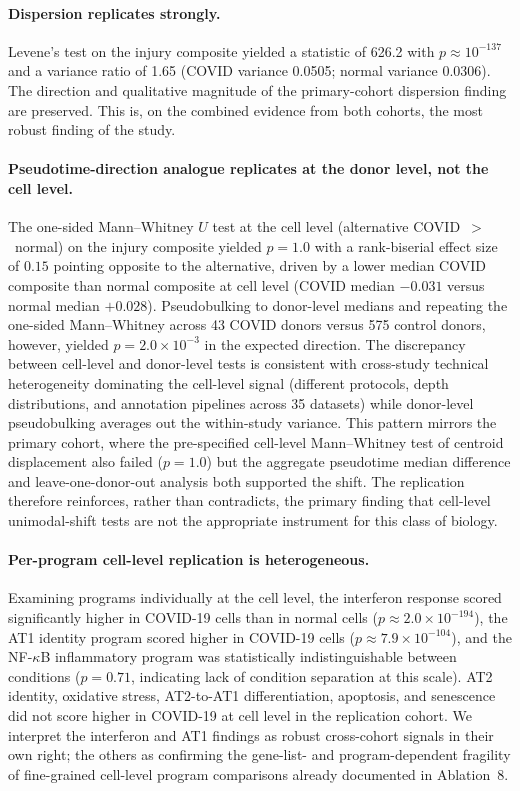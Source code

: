 \documentclass[11pt]{article}
\begin{document}
\paragraph{Dispersion replicates strongly.} Levene's test on the injury composite yielded a statistic of 626.2 with $p \approx 10^{-137}$ and a variance ratio of 1.65 (COVID variance 0.0505; normal variance 0.0306). The direction and qualitative magnitude of the primary-cohort dispersion finding are preserved. This is, on the combined evidence from both cohorts, the most robust finding of the study.

\paragraph{Pseudotime-direction analogue replicates at the donor level, not the cell level.} The one-sided Mann--Whitney $U$ test at the cell level (alternative COVID~$>$~normal) on the injury composite yielded $p = 1.0$ with a rank-biserial effect size of $0.15$ pointing opposite to the alternative, driven by a lower median COVID composite than normal composite at cell level (COVID median $-0.031$ versus normal median $+0.028$). Pseudobulking to donor-level medians and repeating the one-sided Mann--Whitney across 43 COVID donors versus 575 control donors, however, yielded $p = 2.0 \times 10^{-3}$ in the expected direction. The discrepancy between cell-level and donor-level tests is consistent with cross-study technical heterogeneity dominating the cell-level signal (different protocols, depth distributions, and annotation pipelines across 35 datasets) while donor-level pseudobulking averages out the within-study variance. This pattern mirrors the primary cohort, where the pre-specified cell-level Mann--Whitney test of centroid displacement also failed ($p = 1.0$) but the aggregate pseudotime median difference and leave-one-donor-out analysis both supported the shift. The replication therefore reinforces, rather than contradicts, the primary finding that cell-level unimodal-shift tests are not the appropriate instrument for this class of biology.

\paragraph{Per-program cell-level replication is heterogeneous.} Examining programs individually at the cell level, the interferon response scored significantly higher in COVID-19 cells than in normal cells ($p \approx 2.0 \times 10^{-194}$), the AT1 identity program scored higher in COVID-19 cells ($p \approx 7.9 \times 10^{-104}$), and the NF-$\kappa$B inflammatory program was statistically indistinguishable between conditions ($p = 0.71$, indicating lack of condition separation at this scale). AT2 identity, oxidative stress, AT2-to-AT1 differentiation, apoptosis, and senescence did not score higher in COVID-19 at cell level in the replication cohort. We interpret the interferon and AT1 findings as robust cross-cohort signals in their own right; the others as confirming the gene-list- and program-dependent fragility of fine-grained cell-level program comparisons already documented in Ablation~8.
\end{document}
